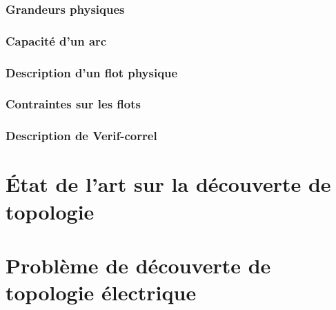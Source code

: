 			\subsubsection{Grandeurs physiques}
				
			\subsubsection{Capacit\'e d'un arc}
				
			\subsubsection{ Description d'un flot physique}
				
			\subsubsection{ Contraintes sur les flots}
				
			\subsubsection{Description de Verif-correl}
				
%			 	
		
		
	\section{\'Etat de l'art sur la d\'ecouverte de topologie}
		
			

	\section{Probl\`eme de d\'ecouverte de topologie \'electrique}
		
			
